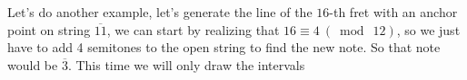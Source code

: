 \documentclass[preview]{standalone}
\begin{document}
\begin{center}
Let's do another example, let's generate the line of the $16$-th fret with an anchor point on string $\overline{11}$, we can start by realizing that $ 16  \equiv 4 \ (\bmod \ 12) $, so we just have to add 4 semitones to the open string to find the new note. So that note would be $\overline{3}$. This time we will only draw the intervals
\end{center}
\end{document}
